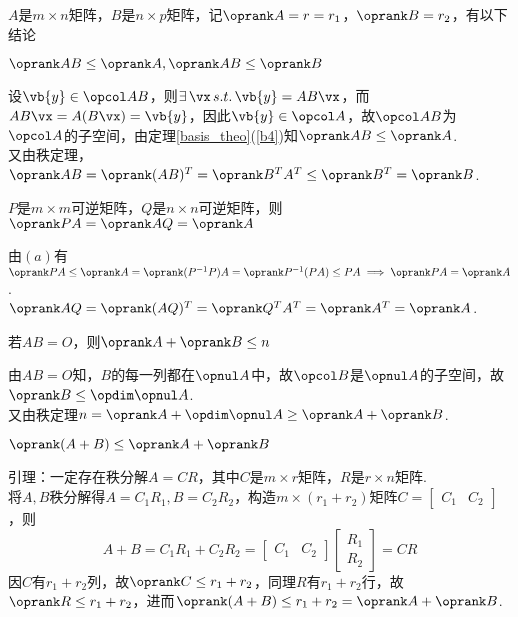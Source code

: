 \begin{theorem}[秩的进阶定理]%
$A$是$m\times n$矩阵，$B$是$n\times p$矩阵，记$\oprank A=r=r_1$，$\oprank B=r_2$，有以下结论
\begin{partlist}
	\item $\oprank AB\leq \oprank A,\oprank AB\leq \oprank B$
	\begin{analysis}
	设$\vb{y}\in\opcol AB$，则$\exists\,\vx\,s.t.\,\vb{y}=AB\vx$，而$AB\vx=A(B\vx)=\vb{y}$，因此$\vb{y}\in\opcol A$，故$\opcol AB$为$\opcol A$的子空间，由定理\ref{basis_theo}(\ref{b4})知$\oprank AB\leq \oprank A$.\\
	又由秩定理，$\oprank AB=\oprank(AB)^T=\oprank B^TA^T\leq\oprank B^T=\oprank B$.
	\end{analysis}
	\item $P$是$m\times m$可逆矩阵，$Q$是$n\times n$可逆矩阵，则$\oprank PA=\oprank AQ=\oprank A$
	\begin{analysis}
	由$(a)$有$\oprank PA\leq\oprank A=\oprank(P^{-1}P)A=\oprank P^{-1}(PA)\leq PA\implies \oprank PA=\oprank A$.\\
	$\oprank AQ=\oprank (AQ)^T=\oprank Q^TA^T=\oprank A^T=\oprank A$.
	\end{analysis}
	\item 若$AB=O$，则$\oprank A+\oprank B\leq n$
	\begin{analysis}
	由$AB=O$知，$B$的每一列都在$\opnul A$中，故$\opcol B$是$\opnul A$的子空间，故$\oprank B\leq \opdim\opnul A$.\\
	又由秩定理$n=\oprank A+\opdim \opnul A\geq\oprank A+\oprank B$.
	\end{analysis}
	\item $\oprank(A+B)\leq\oprank A+\oprank B$
	\begin{analysis}
	引理：一定存在秩分解$A=CR$，其中$C$是$m\times r$矩阵，$R$是$r\times n$矩阵.\\
	将$A,B$秩分解得$A=C_1R_1,B=C_2R_2$，构造$m\times (r_1+r_2)$矩阵$C=\begin{bmatrix}C_1&C_2\end{bmatrix}$，则
	\[A+B=C_1R_1+C_2R_2=\begin{bmatrix}C_1&C_2\end{bmatrix}\begin{bmatrix}R_1\\R_2\end{bmatrix}=CR\]
	因$C$有$r_1+r_2$列，故$\oprank C\leq r_1+r_2$，同理$R$有$r_1+r_2$行，故$\oprank R\leq r_1+r_2$，进而$\oprank (A+B)\leq r_1+r_2=\oprank A+\oprank B$.
	\end{analysis}

\end{partlist}
\end{theorem}
